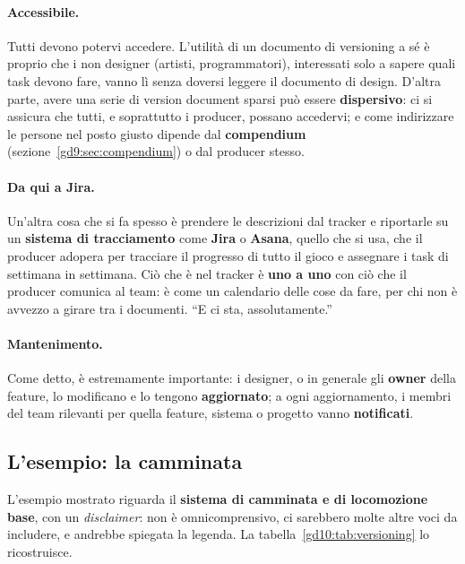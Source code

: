 \paragraph{Accessibile.} Tutti devono potervi accedere. L'utilità di un
documento di versioning a sé è proprio che i non designer (artisti,
programmatori), interessati solo a sapere quali task devono fare, vanno lì
senza doversi leggere il documento di design. D'altra parte, avere una serie
di version document sparsi può essere \textbf{dispersivo}: ci si assicura che
tutti, e soprattutto i producer, possano accedervi; e come indirizzare le
persone nel posto giusto dipende dal \textbf{compendium}
(sezione~\ref{gd9:sec:compendium}) o dal producer stesso.

\paragraph{Da qui a Jira.} Un'altra cosa che si fa spesso è prendere le
descrizioni dal tracker e riportarle su un \textbf{sistema di tracciamento}
come \textbf{Jira} o \textbf{Asana}, quello che si usa, che il producer
adopera per tracciare il progresso di tutto il gioco e assegnare i task di
settimana in settimana. Ciò che è nel tracker è \textbf{uno a uno} con ciò che
il producer comunica al team: è come un calendario delle cose da fare, per
chi non è avvezzo a girare tra i documenti. ``E ci sta, assolutamente.''

\paragraph{Mantenimento.} Come detto, è estremamente importante: i designer,
o in generale gli \textbf{owner} della feature, lo modificano e lo tengono
\textbf{aggiornato}; a ogni aggiornamento, i membri del team rilevanti per
quella feature, sistema o progetto vanno \textbf{notificati}.

\subsection{L'esempio: la camminata}

L'esempio mostrato riguarda il \textbf{sistema di camminata e di locomozione
base}, con un \emph{disclaimer}: non è omnicomprensivo, ci sarebbero molte
altre voci da includere, e andrebbe spiegata la legenda. La
tabella~\ref{gd10:tab:versioning} lo ricostruisce.

